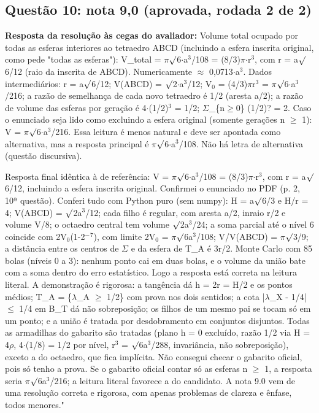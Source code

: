 \documentclass{article}%
\begin{document}
\subsection*{Questão 10: nota 9,0 (aprovada, rodada 2 de 2)}%
\textbf{Resposta da resolução às cegas do avaliador:} Volume total ocupado por todas as esferas interiores ao tetraedro ABCD (incluindo a esfera inscrita original, como pede "todas as esferas"):\newline%
\newline%
V\_total = $\pi$$\surd$6$\cdot$a$^3$/108 = (8/3)$\pi$$\cdot$r$^3$, com r = a$\surd$6/12 (raio da inscrita de ABCD). Numericamente $\approx$ 0,0713$\cdot$a$^3$.\newline%
\newline%
Dados intermediários: r = a$\surd$6/12; V(ABCD) = $\surd$2$\cdot$a$^3$/12; V$_{0}$ = (4/3)$\pi$r$^3$ = $\pi$$\surd$6$\cdot$a$^3$/216; a razão de semelhança de cada novo tetraedro é 1/2 (aresta a/2); a razão de volume das esferas por geração é 4$\cdot$(1/2)$^3$ = 1/2; $\Sigma$\_\{n$\geq$0\} (1/2)? = 2.\newline%
\newline%
Caso o enunciado seja lido como excluindo a esfera original (somente gerações n $\geq$ 1): V = $\pi$$\surd$6$\cdot$a$^3$/216. Essa leitura é menos natural e deve ser apontada como alternativa, mas a resposta principal é $\pi$$\surd$6$\cdot$a$^3$/108.\newline%
\newline%
Não há letra de alternativa (questão discursiva).\par %
Resposta final idêntica à de referência: V = $\pi$$\surd$6$\cdot$a$^3$/108 = (8/3)$\pi$$\cdot$r$^3$, com r = a$\surd$6/12, incluindo a esfera inscrita original. Confirmei o enunciado no PDF (p. 2, 10ª questão). Conferi tudo com Python puro (sem numpy): H = a$\surd$6/3 e H/r = 4; V(ABCD) = $\surd$2a$^3$/12; cada filho é regular, com aresta a/2, inraio r/2 e volume V/8; o octaedro central tem volume $\surd$2a$^3$/24; a soma parcial até o nível 6 coincide com 2V$_{0}$(1-2$^{-}$$^{7}$), com limite 2V$_{0}$ = $\pi$$\surd$6a$^3$/108; V/V(ABCD) = $\pi$$\surd$3/9; a distância entre os centros de $\Sigma$ e da esfera de T\_A é 3r/2. Monte Carlo com 85 bolas (níveis 0 a 3): nenhum ponto cai em duas bolas, e o volume da união bate com a soma dentro do erro estatístico. Logo a resposta está correta na leitura literal. A demonstração é rigorosa: a tangência dá h = 2r = H/2 e os pontos médios; T\_A = \{$\lambda$\_A $\geq$ 1/2\} com prova nos dois sentidos; a cota |$\lambda$\_X - 1/4| $\leq$ 1/4 em B\_T dá não sobreposição; os filhos de um mesmo pai se tocam só em um ponto; e a união é tratada por desdobramento em conjuntos disjuntos. Todas as armadilhas do gabarito são tratadas (plano h = 0 excluído, razão 1/2 via H = 4$\rho$, 4$\cdot$(1/8) = 1/2 por nível, r$^3$ = $\surd$6a$^3$/288, invariância, não sobreposição), exceto a do octaedro, que fica implícita. Não consegui checar o gabarito oficial, pois só tenho a prova. Se o gabarito oficial contar só as esferas n $\geq$ 1, a resposta seria $\pi$$\surd$6a$^3$/216; a leitura literal favorece a do candidato. A nota 9.0 vem de uma resolução correta e rigorosa, com apenas problemas de clareza e ênfase, todos menores."%
$$
\end{document}
